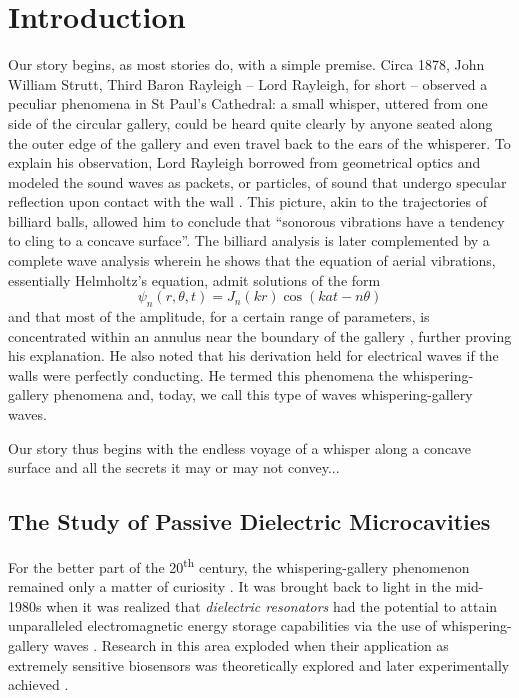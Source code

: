 \chapter{Introduction}

Our story begins, as most stories do, with a simple premise. 
Circa 1878, John William Strutt, Third Baron Rayleigh -- Lord Rayleigh, for short -- 
observed a peculiar phenomena in 
St Paul's Cathedral: a small whisper, uttered from one side of the circular
gallery, could be heard quite clearly by anyone seated along the outer edge of the gallery
and even travel back to the ears of the whisperer.
To explain his observation, Lord Rayleigh borrowed from geometrical optics
and modeled the sound waves as packets, or particles, of sound that undergo
specular reflection upon contact with the wall \cite[\S287]{RAY1878}. 
This picture, akin to the trajectories of billiard balls, allowed him to 
conclude that ``sonorous vibrations have a tendency to cling to a concave surface''.
The billiard analysis is later complemented by a complete wave analysis wherein 
he shows that the equation of aerial vibrations, essentially Helmholtz's equation, 
admit solutions of the form
  \begin{equation*}
   \psi_n(r,\theta,t)=J_n(kr)\cos(kat-n\theta)
  \end{equation*}
and that most of the amplitude, for a certain range of parameters, 
is concentrated within an annulus near the boundary of the gallery \cite{RAY1910}, 
further proving his explanation.
He also noted that his derivation held for electrical waves if the walls
were perfectly conducting. He termed this phenomena the whispering-gallery 
phenomena and, today, we call this type of waves whispering-gallery waves.

Our story thus begins with the endless voyage of a whisper
along a concave surface and all the secrets it may or may not
convey...

\section{The Study of Passive Dielectric Microcavities}

For the better part of the 20\textsuperscript{th} century, the whispering-gallery 
phenomenon remained only a matter of curiosity \cite{WRI2012}. It was brought
back to light in the mid-1980s when it was realized that \textit{dielectric resonators}
had the potential to attain unparalleled electromagnetic energy storage
capabilities via the use of whispering-gallery waves \cite{YAM1993}.
Research in this area exploded when their application as 
extremely sensitive biosensors was theoretically explored 
and later experimentally achieved \cite{SER95,VOL2002,ARM2003,VOL2008}.

